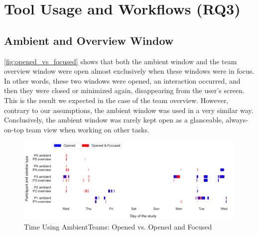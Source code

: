 



\section{Tool Usage and Workflows (RQ3)}
\label{section:tool_usage_and_workflows}

\subsection{Ambient and Overview Window}
\autoref{fig:opened_vs_focused} shows that both the ambient window and the team overview window were open almost exclusively when these windows were in focus. In other words, these two windows were opened, an interaction occurred, and then they were closed or minimized again, disappearing from the user's screen. This is the result we expected in the case of the team overview. However, contrary to our assumptions, the ambient window was used in a very similar way. Conclusively, the ambient window was rarely kept open as a glanceable, always-on-top team view when working on other tasks.

\begin{figure}[h]
    \centering
    \includegraphics[width=\linewidth]{plots/open_vs_focus.pdf}
    \caption{Time Using AmbientTeams: Opened vs. Opened and Focused}
    \label{fig:opened_vs_focused}
\end{figure}

